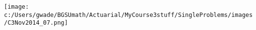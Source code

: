 
\texttt{[image: c:/Users/gwade/BGSUmath/Actuarial/MyCourse3stuff/SingleProblems/images/C3Nov2014\_07.png]}

\showsol{\bsoln

\esoln}
